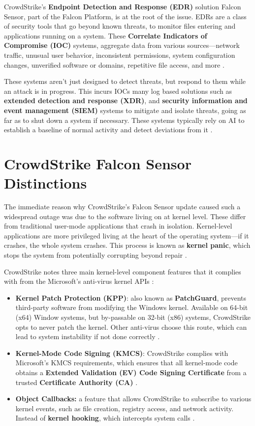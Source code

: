 CrowdStrike's \textbf{Endpoint Detection and Response (EDR)} solution Falcon Sensor, part of the Falcon Platform, is at the root of the issue.
EDRs are a class of security tools that go beyond known threats, to monitor files entering and applications running on a system.
These \textbf{Correlate Indicators of Compromise (IOC)} systems, aggregate data from various sources---network traffic, unusual user behavior,
inconsistent permissions, system configuration changes, unverified software or domains, repetitive file access, and more \cite{microsoft_ioc}.

These systems aren't just designed to detect threats, but respond to them while an attack is in progress. This incurs IOCs many log based solutions such as 
\textbf{extended detection and response (XDR)}, and \textbf{security information and event management (SIEM)} systems to mitigate and isolate threats, going 
as far as to shut down a system if necessary. These systems typically rely on AI to establish a baseline of normal activity and detect deviations from it \cite{microsoft_ioc}.

\section{CrowdStrike Falcon Sensor Distinctions}

The immediate reason why CrowdStrike's Falcon Sensor update caused such a widespread outage was due to
the software living on at kernel level. These differ from traditional user-mode applications that crash in isolation.
Kernel-level applications are more privileged living at the heart of the operating system---if it crashes, the whole system crashes. 
This process is known as \textbf{kernel panic}, which stops the system from potentially corrupting beyond repair \cite{awati_kernel_panic}.

CrowdStrike notes three main kernel-level component features that it complies with from the Microsoft's anti-virus kernel APIs \cite{ionescu_kernel_access_2024}:
\begin{itemize}
    \item \textbf{Kernel Patch Protection (KPP)}: also known as \textbf{PatchGuard}, prevents third-party software from modifying the Windows kernel.
    Available on 64-bit (x64) Window systems, but by-passable on 32-bit (x86) systems, CrowdStrike opts to never patch the kernel. Other 
    anti-virus choose this route, which can lead to system instability if not done correctly \cite{wikipedia_kpp}.
    \item \textbf{Kernel-Mode Code Signing (KMCS)}: CrowdStrike complies with Microsoft's KMCS requirements, which ensures that all kernel-mode code obtains a
    \textbf{Extended Validation (EV) Code Signing Certificate} from a trusted \textbf{Certificate Authority (CA)} \cite{microsoft_kmcs}\cite{reasonlabs_kernel_hooking}.
    \item \textbf{Object Callbacks:} a feature that allows CrowdStrike to subscribe to various kernel events, such as file creation, registry access, and network activity.
    Instead of \textbf{kernel hooking}, which intercepts system calls \cite{microsoft_obregistercallbacks}.
\end{itemize}

